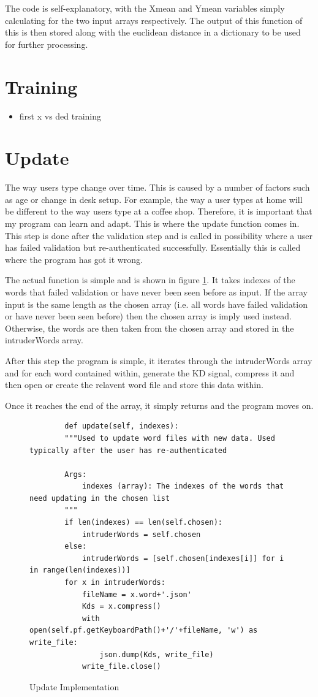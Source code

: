 \documentclass[10pt,a4paper]{report}
\begin{document}
The code is self-explanatory, with the Xmean and Ymean variables simply calculating for the two input arrays respectively. The output of this function of this is then stored along with the euclidean distance in a dictionary to be used for further processing.

\section{Training}
\begin{itemize}
	\item first x vs ded training
\end{itemize}
\section{Update}
\label{sssec:update}

The way users type change over time. This is caused by a number of factors such as age or change in desk setup. For example, the way a user types at home will be different to the way users type at a coffee shop. Therefore, it is important that my program can learn and adapt. This is where the update function comes in. This step is done after the validation step and is called in possibility where a user has failed validation but re-authenticated successfully. Essentially this is called where the program has got it wrong. 

The actual function is simple and is shown in figure \ref{fig:UpdateCode}. It takes indexes of the words that failed validation or have never been seen before as input. If the array input is the same length as the chosen array (i.e. all words have failed validation or have never been seen before) then the chosen array is imply used instead. Otherwise, the words are then taken from the chosen array and stored in the intruderWords array. 

After this step the program is simple, it iterates through the intruderWords array and for each word contained within, generate the KD signal, compress it and then open or create the relavent word file and store this data within.

Once it reaches the end of the array, it simply returns and the program moves on.

\begin{figure}
	\begin{lstlisting}
		def update(self, indexes):
        """Used to update word files with new data. Used typically after the user has re-authenticated

        Args:
            indexes (array): The indexes of the words that need updating in the chosen list
        """
        if len(indexes) == len(self.chosen):
            intruderWords = self.chosen
        else:
            intruderWords = [self.chosen[indexes[i]] for i in range(len(indexes))]
        for x in intruderWords:
            fileName = x.word+'.json'
            Kds = x.compress()
            with open(self.pf.getKeyboardPath()+'/'+fileName, 'w') as write_file:
                json.dump(Kds, write_file)
            write_file.close()
	\end{lstlisting}
	\caption{Update Implementation}
	\label{fig:UpdateCode}
\end{figure}
\end{document}

